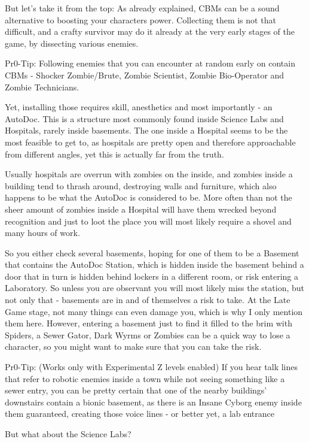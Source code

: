 \documentclass[11pt]{report}
\begin{document}
But let's take it from the top:
As already explained, CBMs can be a sound alternative to boosting your characters power. Collecting them is not that difficult, and a crafty survivor may do it already at the very early stages of the game, by dissecting various enemies.

Pr0-Tip: Following enemies that you can encounter at random early on contain CBMs - Shocker Zombie/Brute, Zombie Scientist, Zombie Bio-Operator and Zombie Technicians.

Yet, installing those requires skill, anesthetics and most importantly - an AutoDoc. This is a structure most commonly found inside Science Labs and Hospitals, rarely inside basements. The one inside a Hospital seems to be the most feasible to get to, as hospitals are pretty open and therefore approachable from different angles, yet this is actually far from the truth.

Usually hospitals are overrun with zombies on the inside, and zombies inside a building tend to thrash around, destroying walls and furniture, which also happens to be what the AutoDoc is considered to be. More often than not the sheer amount of zombies inside a Hospital will have them wrecked beyond recognition and just to loot the place you will most likely require a shovel and many hours of work.

So you either check several basements, hoping for one of them to be a Basement that contains the AutoDoc Station, which is hidden inside the basement behind a door that in turn is hidden behind lockers in a different room, or risk entering a Laboratory. So unless you are observant you will most likely miss the station, but not only that - basements are in and of themselves a risk to take. At the Late Game stage, not many things can even damage you, which is why I only mention them here. However, entering a basement just to find it filled to the brim with Spiders, a Sewer Gator, Dark Wyrms or Zombies can be a quick way to lose a character, so you might want to make sure that you can take the risk.

Pr0-Tip: (Works only with Experimental Z levels enabled) If you hear talk lines that refer to robotic enemies inside a town while not seeing something like a sewer entry, you can be pretty certain that one of the nearby buildings' downstairs contain a bionic basement, as there is an Insane Cyborg enemy inside them guaranteed, creating those voice lines - or better yet, a lab entrance

But what about the Science Labs?
\end{document}
